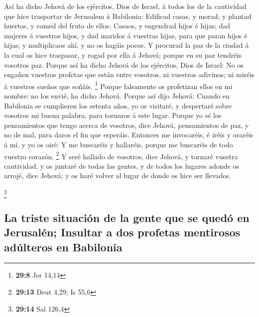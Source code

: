 Así ha dicho Jehová de los ejércitos, Dios de Israel, á
todos los de la cautividad que hice trasportar de Jerusalem á Babilonia:
 Edificad casas, y morad; y plantad huertos, y comed del
fruto de ellos;  Casaos, y engendrad hijos é hijas; dad
mujeres á vuestros hijos, y dad maridos á vuestras hijas, para que paran
hijos é hijas; y multiplicaos ahí, y no os hagáis pocos. 
Y procurad la paz de la ciudad á la cual os hice traspasar, y rogad por
ella á Jehová; porque en su paz tendréis vosotros paz. 
Porque así ha dicho Jehová de los ejércitos, Dios de Israel: No os
engañen vuestros profetas que están entre vosotros, ni vuestros
adivinos; ni miréis á vuestros sueños que soñáis. \footnote{\textbf{29:8}
  Jer 14,14}  Porque falsamente os profetizan ellos en mi
nombre: no los envié, ha dicho Jehová.  Porque así dijo
Jehová: Cuando en Babilonia se cumplieren los setenta años, yo os
visitaré, y despertaré sobre vosotros mi buena palabra, para tornaros á
este lugar.  Porque yo sé los pensamientos que tengo
acerca de vosotros, dice Jehová, pensamientos de paz, y no de mal, para
daros el fin que esperáis.  Entonces me invocaréis, é
iréis y oraréis á mí, y yo os oiré:  Y me buscaréis y
hallaréis, porque me buscaréis de todo vuestro corazón. \footnote{\textbf{29:13}
  Deut 4,29; Is 55,6}  Y seré hallado de vosotros, dice
Jehová, y tornaré vuestra cautividad, y os juntaré de todas las gentes,
y de todos los lugares adonde os arrojé, dice Jehová; y os haré volver
al lugar de donde os hice ser llevados.

\footnote{\textbf{29:14} Sal 126,4}

\hypertarget{la-triste-situaciuxf3n-de-la-gente-que-se-queduxf3-en-jerusaluxe9n-insultar-a-dos-profetas-mentirosos-aduxfalteros-en-babilonia}{%
\subsection{La triste situación de la gente que se quedó en Jerusalén;
Insultar a dos profetas mentirosos adúlteros en
Babilonia}\label{la-triste-situaciuxf3n-de-la-gente-que-se-queduxf3-en-jerusaluxe9n-insultar-a-dos-profetas-mentirosos-aduxfalteros-en-babilonia}}

